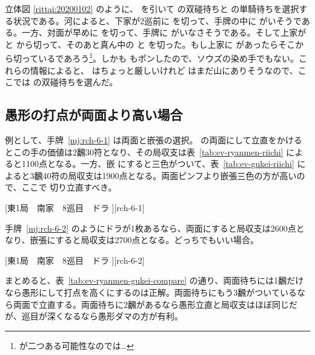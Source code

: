 \documentclass[../nankiru_main.tex]{subfiles}
\begin{document}
立体図 \ref{rittai:20200102} のように、 を引いて  の双碰待ちと  の単騎待ちを選択する状況である。河によると、下家が2巡前に  を切って、手牌の中に  がいそうである。一方、対面が早めに  を切って、手牌に  がいなさそうである。そして上家が  と  から切って、そのあと真ん中の  と  を切った。もし上家に  があったらそこから切っているであろう\footnote{ が二つある可能性なのでは…}。しかも  もポンしたので、ソウズの染め手でもない。これらの情報によると、 はちょっと厳しいけれど  はまだ山にありそうなので、ここで\citet[p.~58]{muhai}は  の双碰待ちを選んだ。


\subsection{愚形の打点が両面より高い場合}

例として、手牌~\ref{mj:rch-6-1} は両面と嵌張の選択。 の両面にして立直をかけるとこの手の価値は2飜30符となり、その局収支は表~\ref{tab:ev-ryanmen-riichi} によると1100点となる。一方、嵌  にすると三色がついて、表~\ref{tab:ev-gukei-riichi} によると3飜40符の局収支は1900点となる。両面ピンフより嵌張三色の方が高いので、ここで  切り立直すべき\citep[][p. 55]{miinin-stat}。

[東1局　南家　8巡目　ドラ ][rch-6-1]

手牌~\ref{mj:rch-6-2} のようにドラが1枚あるなら、両面にすると局収支は2600点となり、嵌張にすると局収支は2700点となる。どっちでもいい場合\citep[][p. 56]{miinin-stat}。

[東1局　南家　8巡目　ドラ ][rch-6-2]

まとめると、表~\ref{tab:ev-ryanmen-gukei-compare} の通り、両面待ちには1飜だけなら愚形にして打点を高くにするのは正解。両面待ちにもう3飜がついているなら両面で立直する。両面待ちに2飜があるなら愚形立直と局収支はほぼ同じだが、巡目が深くなるなら愚形ダマの方が有利。
\end{document}
